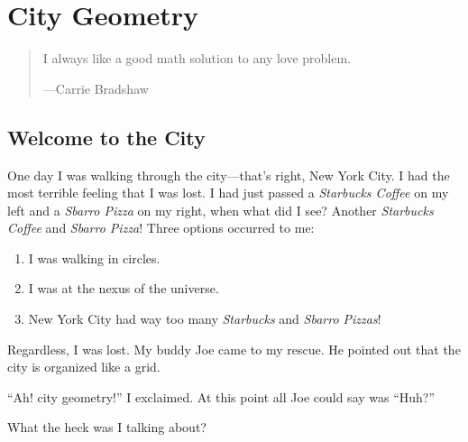 \chapter{City Geometry}
\begin{quote} 
I always like a good math solution to any love problem.

\hfill---Carrie Bradshaw
%
%
\end{quote}



\section{Welcome to the City}


One day I was walking through the city---that's right, New York City. I
had the most terrible feeling that I was lost. I had just passed a
\textit{Starbucks Coffee} on my left and a \textit{Sbarro Pizza} on my
right, when what did I see? Another \textit{Starbucks Coffee} and
\textit{Sbarro Pizza}! Three options occurred to me:
\begin{enumerate}
\item I was walking in circles.
\item I was at the nexus of the universe.
\item New York City had way too many \textit{Starbucks} and \textit{Sbarro Pizzas}!
\end{enumerate}
Regardless, I was lost. My buddy Joe came to my rescue. He pointed out that the city is organized like a grid. 

``Ah! city geometry!'' I exclaimed. At this point all Joe could say was
``Huh?''


\begin{question} What the heck was I talking about?
\end{question}

